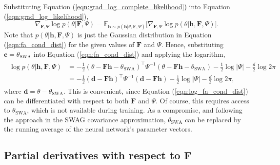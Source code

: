\documentclass[msc,deptreport.inf]{infthesis} %
\newcommand{\matr}[1]{\mathbf{#1}}
\newcommand{\E}{\mathbb E}
\begin{document}
Substituting Equation (\ref{eqn:grad_log_complete_likelihood}) into Equation (\ref{eqn:grad_log_likelihood}),
\begin{equation}\label{eqn:simplified_grad_log_likelihood}
	\nabla_{\matr{F}, \Psi} \log p(\theta | \matr{F}, \Psi)
	= \E_{\matr{h} \sim p(\matr{h} | \theta, \matr{F}, \Psi)} \big[ \nabla_{\matr{F}, \Psi} \log p(\theta | \matr{h}, \matr{F}, \Psi) \big].
\end{equation}
Note that $p(\theta | \matr{h}, \matr{F}, \Psi)$ is just the Gaussian distribution in Equation (\ref{eqn:fa_cond_dist}) for the given values of $\matr{F}$ and $\Psi$. Hence, substituting $\matr{c} = \theta_{\text{SWA}}$ into Equation (\ref{eqn:fa_cond_dist}) and applying the logarithm,
\begin{align}\label{eqn:log_fa_cond_dist}
\begin{split}
	\log p(\theta | \matr{h}, \matr{F}, \Psi)
	& = -\frac{1}{2} (\theta - \matr{Fh} - \theta_{\text{SWA}})^\intercal \Psi^{-1} (\theta - \matr{Fh} - \theta_{\text{SWA}}) - \frac{1}{2} \log |\Psi| - \frac{d}{2} \log 2\pi \\
	& = -\frac{1}{2} (\matr{d} - \matr{Fh})^\intercal \Psi^{-1} (\matr{d}- \matr{Fh}) - \frac{1}{2} \log |\Psi| - \frac{d}{2} \log 2\pi,
\end{split}
\end{align}
where $\matr{d} = \theta - \theta_{\text{SWA}}$. This is convenient, since Equation (\ref{eqn:log_fa_cond_dist}) can be differentiated with respect to both $\matr{F}$ and $\Psi$. Of course, this requires access to $\theta_{\text{SWA}}$, which is not available during training. As a compromise, and following the approach in the SWAG covariance approximation, $\theta_{\text{SWA}}$ can be replaced by the running average of the neural network's parameter vectors.

\subsection{Partial derivatives with respect to $\matr{F}$}
\end{document}
